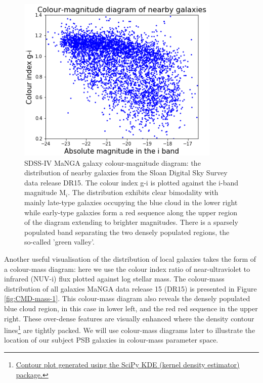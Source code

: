\begin{figure}
    \centering
    \includegraphics[width=\columnwidth]{images/CMDs/CMD-G_i-i.png}
    \caption[SDSS-IV MaNGA galaxy colour-magnitude diagram]{SDSS-IV MaNGA galaxy colour-magnitude diagram: the distribution of nearby galaxies from the Sloan Digital Sky Survey data release DR15. The colour index g-i is plotted against the i-band magnitude M$_i$. The distribution exhibits clear bimodality with mainly late-type galaxies occupying the blue cloud in the lower right while early-type galaxies form a red sequence along the upper region of the diagram extending to brighter magnitudes. There is a sparsely populated band separating the two densely populated regions, the so-called 'green valley'.}
    \label{fig:CMD-G_i-i}
\end{figure}

Another useful visualisation of the distribution of local galaxies takes the form of a colour-mass diagram: here we use the colour index ratio of near-ultraviolet to infrared (NUV-i) flux plotted against log stellar mass. The colour-mass distribution of all galaxies MaNGA data release 15 (DR15) is presented in Figure \ref{fig:CMD-mass-1}. This colour-mass diagram also reveals the densely populated blue cloud region, in this case in lower left, and the red red sequence in the upper right. These over-dense features are visually enhanced where the density contour lines\footnote{\href{https://seaborn.pydata.org/generated/seaborn.kdeplot.html}{Contour plot generated using the SciPy KDE (kernel density estimator) package.}} are tightly packed. We will use colour-mass diagrams later to illustrate the location of our subject PSB galaxies in colour-mass parameter space.

